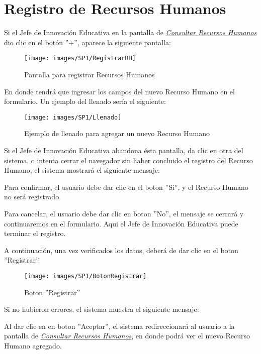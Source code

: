 \newpage
\section{Registro de Recursos Humanos}
Si el Jefe de Innovación Educativa en la pantalla de \hyperlink{consultarrh}{\textit{Consultar Recursos Humanos}} dio clic en el botón ''+'', aparece la siguiente pantalla:

\begin{figure}[!hbtp]
	\centering
	\hypertarget{registrarrh}{\texttt{[image: images/SP1/RegistrarRH]}}
	\caption{Pantalla para registrar Recursos Humanos}
	\label{registrarrh}
\end{figure}

En donde tendrá que ingresar los campos del nuevo Recurso Humano en el formulario. Un ejemplo del llenado sería el siguiente:
\begin{figure}[!hbtp]
	\centering
	\hypertarget{ejreg}{\texttt{[image: images/SP1/Llenado]}}
	\caption{Ejemplo de llenado para agregar un nuevo Recurso Humano}
	\label{ejreg}
\end{figure}

Si el Jefe de Innovación Educativa abandona ésta pantalla, da clic en otra del sistema, o intenta cerrar el navegador sin haber concluido el registro del Recurso Humano, el sistema mostrará el siguiente mensaje:

Para confirmar, el usuario debe dar clic en el boton ''Sí'', y el Recurso Humano no será registrado.

Para cancelar, el usuario debe dar clic en boton ''No'', el mensaje se cerrará y continuaremos en el formulario. Aqui el Jefe de Innovación Educativa puede terminar el registro.

A continuación, una vez verificados los datos, deberá de dar clic en el boton ''Registrar''.
\begin{figure}[!hbtp]
	\centering
	\hypertarget{btnreg}{\texttt{[image: images/SP1/BotonRegistrar]}}
	\caption{Boton ''Registrar''}
	\label{btnreg}
\end{figure}

Si no hubieron errores, el sistema muestra el siguiente mensaje:

Al dar clic en en boton ''Aceptar'', el sistema redireccionará al usuario a la pantalla de \hyperlink{consultarrh}{\textit{Consultar Recursos Humanos}}, en donde podrá ver el nuevo Recurso Humano agregado.

